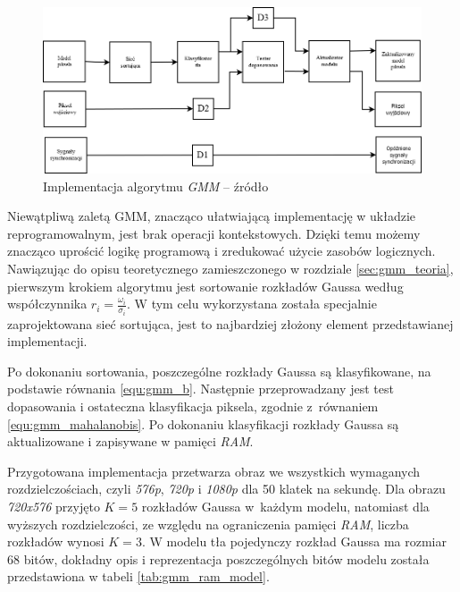 	\begin{figure}[h!]
		\centering
		\includegraphics[scale=0.45]{img/4/gmm.png}
		\caption{Implementacja algorytmu \textit{GMM} -- źródło \cite{piszczek_15}}
		\label{fig:gmm_diagram}
	\end{figure}
	
Niewątpliwą zaletą GMM, znacząco ułatwiającą implementację w układzie reprogramowalnym, jest brak operacji kontekstowych. 
Dzięki temu możemy znacząco uprościć logikę programową i zredukować użycie zasobów logicznych. 
Nawiązując do opisu teoretycznego zamieszczonego w rozdziale \ref{sec:gmm_teoria}, pierwszym krokiem algorytmu jest sortowanie rozkładów Gaussa według współczynnika $r_i = \frac{\omega_i}{\sigma_i}$. 
W tym celu wykorzystana została specjalnie zaprojektowana sieć sortująca, jest to najbardziej złożony element przedstawianej implementacji. 

Po dokonaniu sortowania, poszczególne rozkłady Gaussa są klasyfikowane, na podstawie równania \ref{equ:gmm_b}. 
Następnie przeprowadzany jest test dopasowania i ostateczna klasyfikacja piksela, zgodnie z~równaniem \ref{equ:gmm_mahalanobis}. 
Po dokonaniu klasyfikacji rozkłady Gaussa są aktualizowane i zapisywane w pamięci \textit{RAM}.

Przygotowana implementacja przetwarza obraz we wszystkich wymaganych rozdzielczościach, czyli \textit{576p}, \textit{720p} i \textit{1080p} dla 50 klatek na sekundę. 
Dla obrazu \textit{720x576} przyjęto $K=5$ rozkładów Gaussa w~każdym modelu, natomiast dla wyższych rozdzielczości, ze względu na ograniczenia pamięci \textit{RAM}, liczba rozkładów wynosi $K=3$. 
W modelu tła pojedynczy rozkład Gaussa ma rozmiar $68$ bitów, dokładny opis i reprezentacja poszczególnych bitów modelu została przedstawiona w tabeli \ref{tab:gmm_ram_model}.

